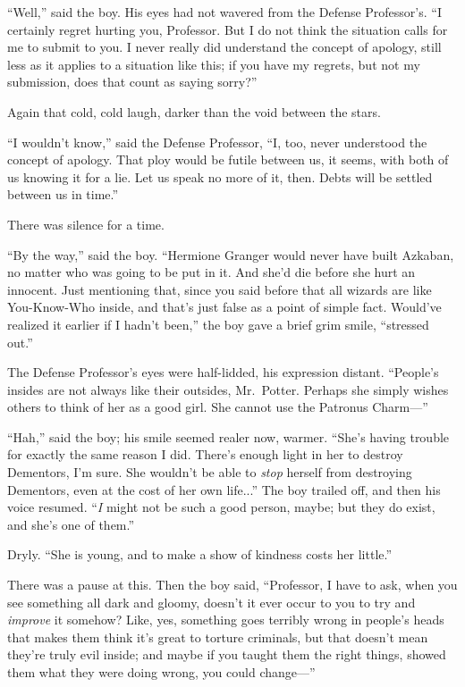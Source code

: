 “Well,” said the boy. His eyes had not wavered from the Defense Professor’s. “I certainly regret hurting you, Professor. But I do not think the situation calls for me to submit to you. I never really did understand the concept of apology, still less as it applies to a situation like this; if you have my regrets, but not my submission, does that count as saying sorry?”

Again that cold, cold laugh, darker than the void between the stars.

“I wouldn’t know,” said the Defense Professor, “I, too, never understood the concept of apology. That ploy would be futile between us, it seems, with both of us knowing it for a lie. Let us speak no more of it, then. Debts will be settled between us in time.”

There was silence for a time.

“By the way,” said the boy. “Hermione Granger would never have built Azkaban, no matter who was going to be put in it. And she’d die before she hurt an innocent. Just mentioning that, since you said before that all wizards are like You-Know-Who inside, and that’s just false as a point of simple fact. Would’ve realized it earlier if I hadn’t been,” the boy gave a brief grim smile, “stressed out.”

The Defense Professor’s eyes were half-lidded, his expression distant. “People’s insides are not always like their outsides, Mr.~Potter. Perhaps she simply wishes others to think of her as a good girl. She cannot use the Patronus Charm—”

“Hah,” said the boy; his smile seemed realer now, warmer. “She’s having trouble for exactly the same reason I did. There’s enough light in her to destroy Dementors, I’m sure. She wouldn’t be able to \emph{stop} herself from destroying Dementors, even at the cost of her own life...” The boy trailed off, and then his voice resumed. “\emph{I} might not be such a good person, maybe; but they do exist, and she’s one of them.”

Dryly. “She is young, and to make a show of kindness costs her little.”

There was a pause at this. Then the boy said, “Professor, I have to ask, when you see something all dark and gloomy, doesn’t it ever occur to you to try and \emph{improve} it somehow? Like, yes, something goes terribly wrong in people’s heads that makes them think it’s great to torture criminals, but that doesn’t mean they’re truly evil inside; and maybe if you taught them the right things, showed them what they were doing wrong, you could change—”

